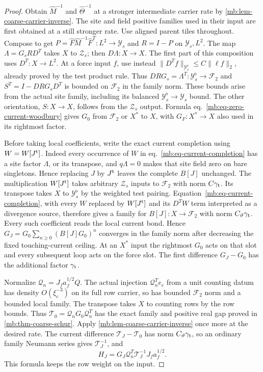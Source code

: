 \documentclass[11pt,letterpaper,reqno]{amsart}
\numberwithin{equation}{section}
\renewcommand{\eqref}[1]{\textup{eq.~\ref{#1}}}
\theoremstyle{definition}
\theoremstyle{remark}
\begin{document}
\begin{proof}
Obtain \(\widehat M^{-1}\) and \(\widehat\Theta^{-1}\) at a stronger intermediate carrier rate by \cref{mb:lem-coarse-carrier-inverse}. The site and field positive families used in their input are first obtained at a still stronger rate. Use aligned parent tiles throughout. Compose to get \(P=\widehat F\widehat M^{-1}\widehat F^T:L^2\to \mathcal Y_s\) and \(R=I-P\) on \(\mathcal Y_s,L^2\). The map \(\Lambda=G_s RD^T\) takes \(X\) to \(\mathcal Z_s\); then \(D\Lambda:X\to X\). The first part of this composition uses \(D^T:X\to L^2\). At a force input \(f\), use instead \(\|D^T f\|_{\mathcal Y_s^\flat}\le C\|\ell f\|_2\), already proved by the test product rule. Thus \(DRG_s=\Lambda^T:\mathcal Y_s^\flat\to\mathcal F_2\) and \(S^T=I-DRG_sD^T\) is bounded on \(\mathcal F_2\) in the family norm. These bounds arise from the actual site family, including its balanced \(\mathcal Y_s^\flat\to \mathcal Y_s\) bound. The other orientation, \(S:X\to X\), follows from the \(\mathcal Z_s\) output. Formula \eqref{mb:eq-zero-current-woodbury} gives \(G_0\) from \(\mathcal F_2\) or \(X^*\) to \(X\), with \(G_F:X^*\to X\) also used in its rightmost factor.

Before taking local coefficients, write the exact current completion using \(W=W[J^{\rm t}]\). Indeed every occurrence of \(W\) in \eqref{mb:eq-current-completion} has a site factor \(\Lambda\), or its transpose, and \(q\Lambda=0\) makes that site field zero on bare singletons. Hence replacing \(J\) by \(J^{\rm t}\) leaves the complete \(B[J]\) unchanged. The multiplication \(W[J^{\rm t}]\) takes arbitrary \(\mathcal Z_s\) inputs to \(\mathcal F_2\) with norm \(C\gamma_{\rm t}\). Its transpose takes \(X\) to \(\mathcal Y_s^\flat\) by the weighted test pairing. Equation~\ref{mb:eq-current-completion}, with every \(W\) replaced by \(W[J^{\rm t}]\) and its \(D^TW\) term interpreted as a divergence source, therefore gives a family for \(B[J]:X\to\mathcal F_2\) with norm \(C_\vartheta\gamma_{\rm t}\). Every such coefficient reads the local current bond. Hence \(G_J=G_0\sum_{n\ge0}(B[J]G_0)^n\) converges in the family norm after decreasing the fixed touching-current ceiling. At an \(X^*\) input the rightmost \(G_0\) acts on that slot and every subsequent loop acts on the force slot. The first difference \(G_J-G_0\) has the additional factor \(\gamma_{\rm t}\).

Normalize \(\mathcal Q_n=J_f a_f^{1/2}Q\). The actual injection \(\mathcal Q_n^T e_c\) from a unit counting datum has density \(O(\xi_c^{-3})\) on its full row carrier, so has bounded \(\mathcal F_2\) norm and a bounded local family. The transpose takes \(X\) to counting rows by the row bounds. Thus \(\mathcal T_0=\mathcal Q_n G_0\mathcal Q_n^T\) has the exact family and positive real gap proved in \cref{mb:thm-coarse-schur}. Apply \cref{mb:lem-coarse-carrier-inverse} once more at the desired rate. The current difference \(\mathcal T_J-\mathcal T_0\) has norm \(C_\vartheta\gamma_{\rm t}\), so an ordinary family Neumann series gives \(\mathcal T_J^{-1}\), and
\[
  H_J=G_J\mathcal Q_n^T\mathcal T_J^{-1}J_fa_f^{1/2}.
\]
This formula keeps the row weight on the input.


\end{proof}
\end{document}
